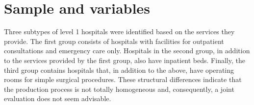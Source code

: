 \documentclass[11pt,a4paper,oneside]{article}
\begin{document}
\color{black}




\color{black}






% 






\section{Sample and variables}
\label{sec:data}


Three subtypes of level 1 hospitals were identified based on the services they provide. The first group consists of hospitals with facilities for outpatient consultations and emergency care only. Hospitals in the second group, in addition to the services provided by the first group, also have inpatient beds. Finally, the third group contains hospitals that, in addition to the above, have operating rooms for simple surgical procedures. These structural differences indicate that the production process is not totally homogeneous and, consequently, a joint evaluation does not seem advisable.

\end{document}
